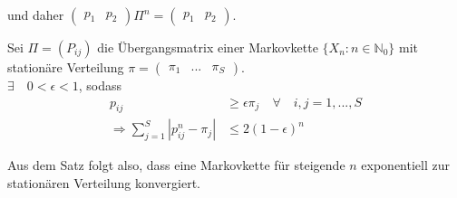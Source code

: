 \documentclass[a4paper,12pt]{article}
\begin{document}
\begin{tcolorbox}[breakable, colframe=blue, colback=white, title=Beispiel 11]
$$	$$
	und daher $\begin{pmatrix}p_1 & p_2 \end{pmatrix}  \Pi^n = \begin{pmatrix}p_1 & p_2 \end{pmatrix} $.
\end{tcolorbox}

\begin{tcolorbox}[breakable, colframe=green, colback=white, title=Satz 14]
	Sei $\Pi = (P_{ij})$ die Übergangsmatrix einer Markovkette $\{X_n: n \in \mathbb{N}_0\}$
	mit stationäre Verteilung $\pi = \begin{pmatrix}\pi_1 & ... & \pi_S \end{pmatrix}$.\\
	$\exists \quad 0 < \epsilon < 1$, sodass
	\begin{align*}
		p_{ij}                                       & \geq \epsilon \pi_j \quad \forall \quad i,j=1, ..., S \\
		\Rightarrow \sum_{j=1}^{S}|p_{ij}^n - \pi_j| & \leq 2(1-\epsilon)^n
	\end{align*}
\end{tcolorbox}
Aus dem Satz folgt also, dass eine Markovkette für steigende $n$ exponentiell zur stationären Verteilung konvergiert.\\
\end{document}
